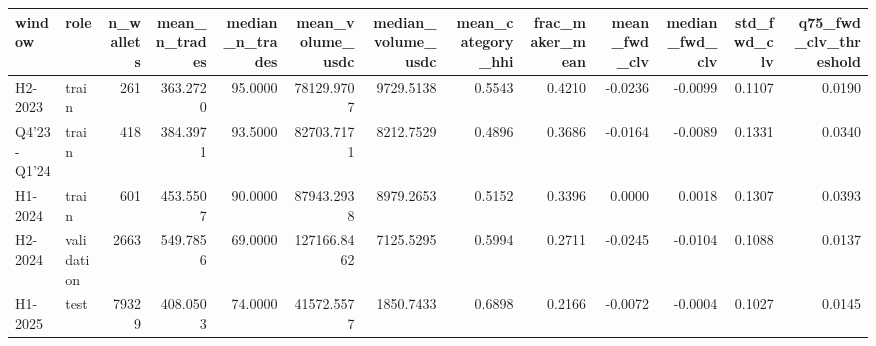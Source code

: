 \begin{tabular}{llrrrrrrrrrrr}
\toprule
window & role & n\_wallets & mean\_n\_trades & median\_n\_trades & mean\_volume\_usdc & median\_volume\_usdc & mean\_category\_hhi & frac\_maker\_mean & mean\_fwd\_clv & median\_fwd\_clv & std\_fwd\_clv & q75\_fwd\_clv\_threshold \\
\midrule
H2-2023 & train & 261 & 363.2720 & 95.0000 & 78129.9707 & 9729.5138 & 0.5543 & 0.4210 & -0.0236 & -0.0099 & 0.1107 & 0.0190 \\
Q4'23-Q1'24 & train & 418 & 384.3971 & 93.5000 & 82703.7171 & 8212.7529 & 0.4896 & 0.3686 & -0.0164 & -0.0089 & 0.1331 & 0.0340 \\
H1-2024 & train & 601 & 453.5507 & 90.0000 & 87943.2938 & 8979.2653 & 0.5152 & 0.3396 & 0.0000 & 0.0018 & 0.1307 & 0.0393 \\
H2-2024 & validation & 2663 & 549.7856 & 69.0000 & 127166.8462 & 7125.5295 & 0.5994 & 0.2711 & -0.0245 & -0.0104 & 0.1088 & 0.0137 \\
H1-2025 & test & 79329 & 408.0503 & 74.0000 & 41572.5577 & 1850.7433 & 0.6898 & 0.2166 & -0.0072 & -0.0004 & 0.1027 & 0.0145 \\
\bottomrule
\end{tabular}
